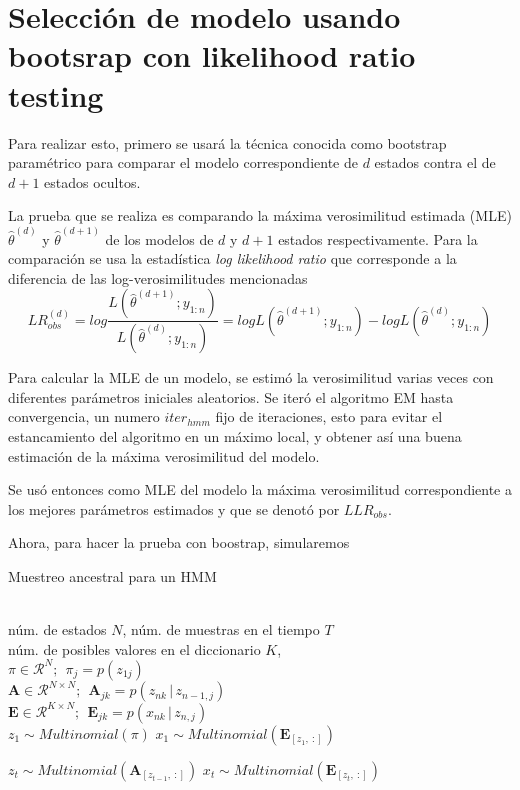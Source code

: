 \section{Selección de modelo usando bootsrap con likelihood ratio testing}

Para realizar esto, primero se usará la técnica conocida como bootstrap paramétrico para comparar el modelo correspondiente de $d$ estados contra el de $d+1$ estados ocultos.

La prueba que se realiza es comparando la máxima verosimilitud estimada (MLE) $\hat \theta^{(d)}$ y $\hat \theta^{(d+1)}$ de los modelos de $d$ y $d+1$ estados respectivamente. Para la comparación se usa la estadística \textit{log likelihood ratio} que corresponde a la diferencia de las log-verosimilitudes mencionadas
\begin{equation}
  LR^{(d)}_{obs} = log \frac{L(\hat \theta^{(d+1)}; y_{1:n})}{L(\hat \theta^{(d)}; y_{1:n})} =
    log L(\hat \theta^{(d+1)}; y_{1:n}) - 
    log L(\hat \theta^{(d)}; y_{1:n})
\end{equation}

Para calcular la MLE de un modelo, se estimó la verosimilitud varias veces con diferentes parámetros iniciales aleatorios. Se iteró el algoritmo EM hasta convergencia, un numero $iter_{hmm}$ fijo de iteraciones, esto para evitar el estancamiento del algoritmo en un máximo local, y obtener así una buena estimación de la máxima verosimilitud del modelo.

Se usó entonces como MLE del modelo la máxima verosimilitud correspondiente a los mejores parámetros estimados y que se denotó por $LLR_{obs}$.

Ahora, para hacer la prueba con boostrap, simularemos 

\begin{algorithm}[tp]
   \caption{Muestreo ancestral para un HMM}
   \label{alg:ancsamp}
\begin{algorithmic}
    \\
   núm. de estados $N$, núm. de muestras en el tiempo $T$ \\
   núm. de posibles valores en el diccionario $K$, \\
   $ \pi \in \mathcal{R}^{N}; ~~ \pi_j = p(z_{1j})$ \\
   $ \mathbf{A} \in \mathcal{R}^{N \times N}; ~~
   \mathbf{A}_{jk} = p(z_{nk} \,|\, z_{n-1, j})$ \\

   $ \mathbf{E} \in \mathcal{R}^{K \times N}; ~~
   \mathbf{E}_{jk} = p(x_{nk} \,|\, z_{n, j})$\\  
   \STATE
   \STATE $z_1 \sim Multinomial(\pi)$   
   \STATE $x_1 \sim Multinomial(\mathbf{E}_{[z_1,~:]})$

    \STATE $z_t \sim Multinomial(\mathbf{A}_{[z_{t-1},~:]})$ 
    \STATE $x_t \sim Multinomial(\mathbf{E}_{[z_t,~:]})$
   \ENDFOR   
\end{algorithmic}
\end{algorithm}

